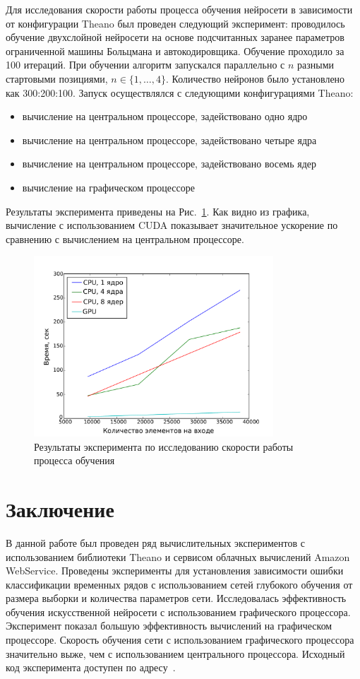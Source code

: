 \documentclass[12pt,twoside]{article}
\begin{document}
Для исследования скорости работы процесса обучения нейросети в зависимости от конфигурации Theano был проведен следующий эксперимент:
проводилось обучение двухслойной нейросети на основе подсчитанных заранее параметров ограниченной машины Больцмана и автокодировщика. Обучение проходило за 100 итераций. При обучении алгоритм запускался параллельно с $n$ разными стартовыми позициями, $n \in \{1,\dots,4\}.$ Количество нейронов было установлено как 300:200:100.
Запуск осуществлялся с следующими конфигурациями Theano:
\begin{itemize}
\item вычисление на центральном процессоре, задействовано
одно ядро
\item вычисление на центральном процессоре, задействовано четыре ядра
\item вычисление на центральном процессоре, задействовано восемь ядер
\item вычисление на графическом процессоре
\end{itemize}

Результаты эксперимента приведены на Рис.~\ref{fig:speed}. Как видно из графика, вычисление с использованием CUDA показывает значительное ускорение по сравнению с вычислением на центральном процессоре.

\begin{figure}[tb!]
  \centering
      \includegraphics[width=0.8\textwidth]{result.pdf}
  \caption{Результаты эксперимента по исследованию скорости работы процесса обучения}
  \label{fig:speed}
\end{figure}

\section{Заключение}
В данной работе был проведен ряд  вычислительных экспериментов с использованием библиотеки Theano и сервисом облачных вычислений Amazon WebService. Проведены эксперименты для установления зависимости ошибки классификации временных рядов с использованием сетей глубокого обучения от размера выборки и количества параметров сети. Исследовалась эффективность обучения искусственной нейросети с использованием графического процессора. Эксперимент показал большую эффективность вычислений на графическом процессоре. Скорость обучения сети с использованием графического процессора значительно выже, чем с использованием центрального процессора. Исходный код эксперимента доступен по адресу~\cite{svn}.
\end{document}
